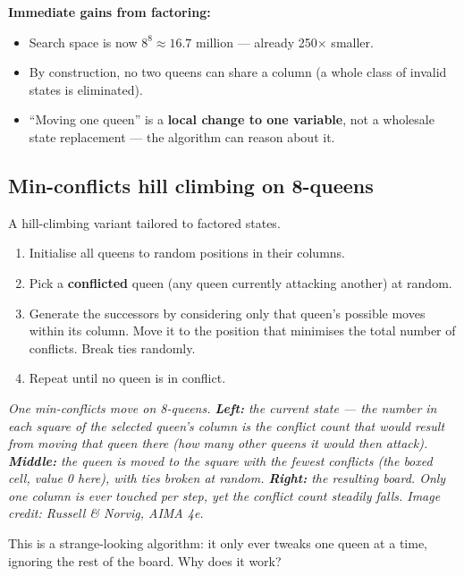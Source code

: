 \documentclass[11pt, a4paper]{article}
\begin{document}
\textbf{Immediate gains from factoring:}
\begin{itemize}
  \item Search space is now $8^8 \approx 16.7$ million — already 250$\times$ smaller.
  \item By construction, no two queens can share a column (a whole class of invalid states is eliminated).
  \item ``Moving one queen'' is a \textbf{local change to one variable}, not a wholesale state replacement — the algorithm can reason about it.
\end{itemize}

\subsection{Min-conflicts hill climbing on 8-queens}

A hill-climbing variant tailored to factored states.

\begin{defbox}
\begin{enumerate}
  \item Initialise all queens to random positions in their columns.
  \item Pick a \textbf{conflicted} queen (any queen currently attacking another) at random.
  \item Generate the successors by considering only that queen's possible moves within its column. Move it to the position that minimises the total number of conflicts. Break ties randomly.
  \item Repeat until no queen is in conflict.
\end{enumerate}
\end{defbox}

\begin{center}

\footnotesize\textit{One min-conflicts move on 8-queens. \textbf{Left:} the current state --- the number in each square of the selected queen's column is the conflict count that would result from moving that queen there (how many other queens it would then attack). \textbf{Middle:} the queen is moved to the square with the fewest conflicts (the boxed cell, value 0 here), with ties broken at random. \textbf{Right:} the resulting board. Only one column is ever touched per step, yet the conflict count steadily falls. Image credit: Russell \& Norvig, AIMA 4e.}
\end{center}

This is a strange-looking algorithm: it only ever tweaks one queen at a time, ignoring the rest of the board. Why does it work?
\end{document}
